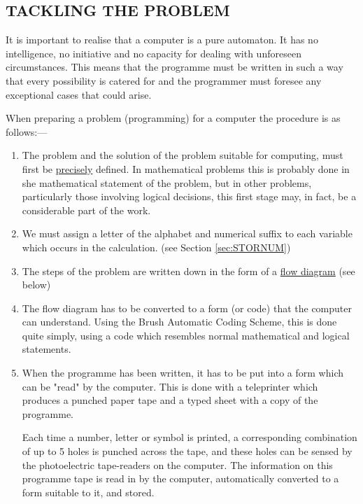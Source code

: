 \documentclass[10pt, a4paper, oneside]{article}
\newcommand{\myuline}[1]{\uline{#1}}
\begin{document}
\begin{multicols}{2}
\subsection{TACKLING THE PROBLEM}

It is important to realise that a computer is a
pure automaton.  It has no intelligence, no initiative
and no capacity for dealing with unforeseen
circumstances.  This means that the programme must
be written in such a way that every possibility is
catered for and the programmer must foresee any
exceptional cases that could arise.

When preparing a problem (programming) for a
computer the procedure is as follows:—

\renewcommand{\labelenumi}{\ifnum\value{enumi}=1 Stage (\roman{enumi})\else (\roman{enumi})\fi}
\begin{enumerate}

\item The problem and the solution of the
problem suitable for computing, must
first be \myuline{precisely} defined.  In
mathematical problems this is
probably done in she mathematical
statement of the problem, but in
other problems, particularly those
involving logical decisions, this
first stage may, in fact, be a
considerable part of the work.

\item We must assign a letter of the
alphabet and numerical suffix to
each variable which occurs in the
calculation.  (see Section \ref{sec:STORNUM})

\item The steps of the problem are written
down in the form of a \myuline{flow diagram}
(see below)

\item The flow diagram has to be converted
to a form (or code) that the computer
can understand.  Using the Brush
Automatic Coding Scheme, this is done
quite simply, using a code which
resembles normal mathematical and
logical statements.

\item When the programme has been written,
it has to be put into a form which
can be "read" by the computer.  This
is done with a teleprinter which
produces a punched paper tape and a
typed sheet with a copy of the
programme.

\hspace{1em} Each time a number, letter or
symbol is printed, a corresponding
combination of up to 5 holes is
punched across the tape, and these
holes can be sensed by the photoelectric
tape-readers on the computer.
The information on this programme tape
is read in by the computer, automatically
converted to a form suitable to
it, and stored.


\end{enumerate}
\end{multicols}
\end{document}
